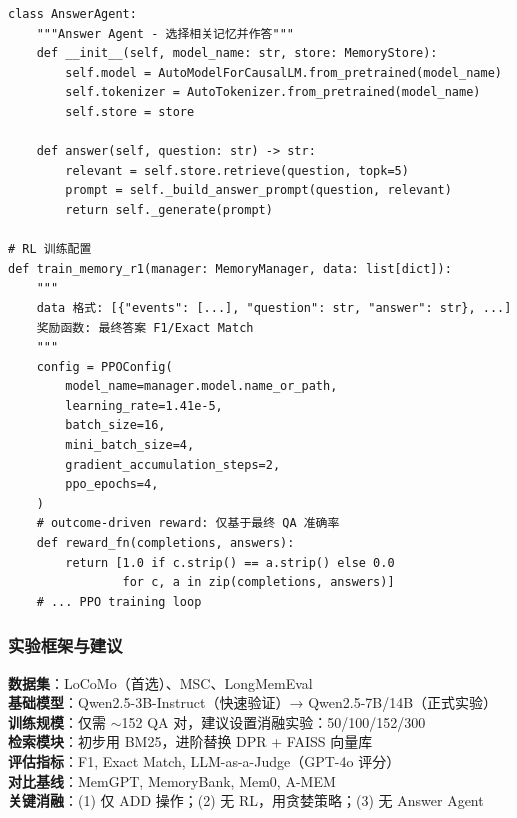 \documentclass[11pt,a4paper]{article}
\begin{document}
\begin{lstlisting}[style=pythonstyle, caption={Memory-R1 核心组件伪代码}]
class AnswerAgent:
    """Answer Agent - 选择相关记忆并作答"""
    def __init__(self, model_name: str, store: MemoryStore):
        self.model = AutoModelForCausalLM.from_pretrained(model_name)
        self.tokenizer = AutoTokenizer.from_pretrained(model_name)
        self.store = store

    def answer(self, question: str) -> str:
        relevant = self.store.retrieve(question, topk=5)
        prompt = self._build_answer_prompt(question, relevant)
        return self._generate(prompt)

# RL 训练配置
def train_memory_r1(manager: MemoryManager, data: list[dict]):
    """
    data 格式: [{"events": [...], "question": str, "answer": str}, ...]
    奖励函数: 最终答案 F1/Exact Match
    """
    config = PPOConfig(
        model_name=manager.model.name_or_path,
        learning_rate=1.41e-5,
        batch_size=16,
        mini_batch_size=4,
        gradient_accumulation_steps=2,
        ppo_epochs=4,
    )
    # outcome-driven reward: 仅基于最终 QA 准确率
    def reward_fn(completions, answers):
        return [1.0 if c.strip() == a.strip() else 0.0
                for c, a in zip(completions, answers)]
    # ... PPO training loop
\end{lstlisting}

\subsubsection{实验框架与建议}

\begin{insightbox}
\textbf{数据集}：LoCoMo（首选）、MSC、LongMemEval \\
\textbf{基础模型}：Qwen2.5-3B-Instruct（快速验证）→ Qwen2.5-7B/14B（正式实验） \\
\textbf{训练规模}：仅需 $\sim$152 QA 对，建议设置消融实验：50/100/152/300 \\
\textbf{检索模块}：初步用 BM25，进阶替换 DPR + FAISS 向量库 \\
\textbf{评估指标}：F1, Exact Match, LLM-as-a-Judge（GPT-4o 评分） \\
\textbf{对比基线}：MemGPT, MemoryBank, Mem0, A-MEM \\
\textbf{关键消融}：(1) 仅 ADD 操作；(2) 无 RL，用贪婪策略；(3) 无 Answer Agent
\end{insightbox}
\end{document}
